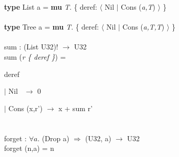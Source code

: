 \documentclass{article}
\begin{document}
\lstset{language=Pascal}          %


\textbf{type} List a = \textbf{mu} \textit{T}. \{ deref: $\langle$ Nil $\vert$ Cons (\textit{a,T}) $\rangle$ \} \\ \\

\textbf{type} Tree a = \textbf{mu} \textit{T}. \{ deref: $\langle$ Nil $\vert$ Cons (\textit{a,T,T}) $\rangle$ \}  \\ \\


\noindent
sum : (List U32)! $\rightarrow$ U32 \\
sum (\textit{r \{ deref \}}) = 

    deref

    $\vert$ Nil  \quad\quad\quad$\,$   $\rightarrow$ 0

    $\vert$ Cons (x,r')  $\rightarrow$ x + sum r' \\ \\ \\

\noindent
forget : $\forall a.$ (Drop a) $\Rightarrow$ (U32, a) $\rightarrow$ U32 \\
forget (n,a) = n
\end{document}
